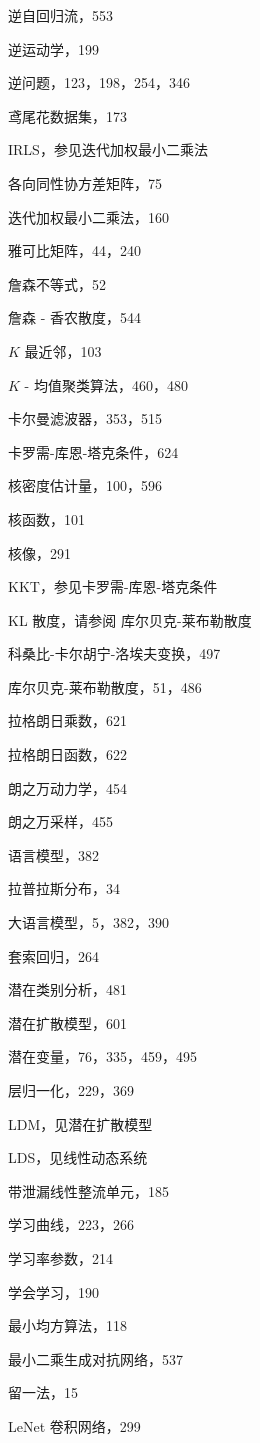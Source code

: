 \documentclass[10pt]{report}
\begin{document}
逆自回归流，553

逆运动学，199

逆问题，123，198，254，346

鸢尾花数据集，173

IRLS，参见迭代加权最小二乘法

各向同性协方差矩阵，75

迭代加权最小二乘法，160

雅可比矩阵，44，240

詹森不等式，52

詹森 - 香农散度，544

\(K\) 最近邻，103

\(K\) - 均值聚类算法，460，480

卡尔曼滤波器，353，515

卡罗需-库恩-塔克条件，624

核密度估计量，100，596

核函数，101

核像，291

KKT，参见卡罗需-库恩-塔克条件

KL 散度，请参阅 库尔贝克-莱布勒散度

科桑比-卡尔胡宁-洛埃夫变换，497

库尔贝克-莱布勒散度，51，486

拉格朗日乘数，621

拉格朗日函数，622

朗之万动力学，454

朗之万采样，455

语言模型，382

拉普拉斯分布，34

大语言模型，5，382，390

套索回归，264

潜在类别分析，481

潜在扩散模型，601

潜在变量，76，335，459，495

层归一化，229，369

LDM，见潜在扩散模型

LDS，见线性动态系统

带泄漏线性整流单元，185

学习曲线，223，266

学习率参数，214

学会学习，190

最小均方算法，118

最小二乘生成对抗网络，537

留一法，15

LeNet 卷积网络，299
\end{document}

